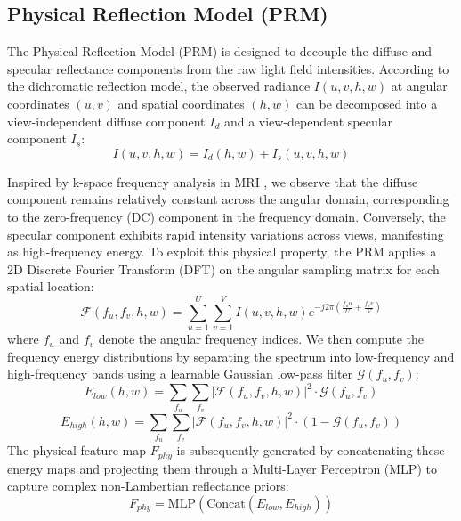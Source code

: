 \documentclass[lettersize,journal]{IEEEtran}
\begin{document}
\subsection{Physical Reflection Model (PRM)}

The Physical Reflection Model (PRM) is designed to decouple the diffuse and specular reflectance components from the raw light field intensities. According to the dichromatic reflection model, the observed radiance $I(u,v,h,w)$ at angular coordinates $(u,v)$ and spatial coordinates $(h,w)$ can be decomposed into a view-independent diffuse component $I_d$ and a view-dependent specular component $I_s$:
\begin{equation}
\label{eq:eq4}
I(u,v,h,w) = I_d(h,w) + I_s(u,v,h,w)
\end{equation}

Inspired by k-space frequency analysis in MRI , we observe that the diffuse component remains relatively constant across the angular domain, corresponding to the zero-frequency (DC) component in the frequency domain. Conversely, the specular component exhibits rapid intensity variations across views, manifesting as high-frequency energy. To exploit this physical property, the PRM applies a 2D Discrete Fourier Transform (DFT) on the angular sampling matrix for each spatial location:
\begin{equation}
\label{eq:eq5}
\mathcal{F}(f_u, f_v, h, w) = \sum_{u=1}^{U} \sum_{v=1}^{V} I(u,v,h,w) e^{-j 2\pi \left(\frac{f_u u}{U} + \frac{f_v v}{V}\right)}
\end{equation}
where $f_u$ and $f_v$ denote the angular frequency indices. We then compute the frequency energy distributions by separating the spectrum into low-frequency and high-frequency bands using a learnable Gaussian low-pass filter $\mathcal{G}(f_u, f_v)$:
\begin{equation}
\label{eq:eq6}
E_{low}(h,w) = \sum_{f_u} \sum_{f_v} |\mathcal{F}(f_u, f_v, h, w)|^2 \cdot \mathcal{G}(f_u, f_v)
\end{equation}
\begin{equation}
\label{eq:eq7}
E_{high}(h,w) = \sum_{f_u} \sum_{f_v} |\mathcal{F}(f_u, f_v, h, w)|^2 \cdot (1 - \mathcal{G}(f_u, f_v))
\end{equation}
The physical feature map $F_{phy}$ is subsequently generated by concatenating these energy maps and projecting them through a Multi-Layer Perceptron (MLP) to capture complex non-Lambertian reflectance priors:
\begin{equation}
\label{eq:eq8}
F_{phy} = \text{MLP}(\text{Concat}(E_{low}, E_{high}))
\end{equation}
\end{document}
